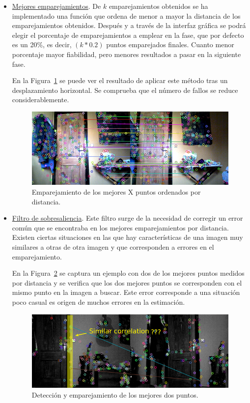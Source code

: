 \begin{itemize}
\item \underline{Mejores emparejamientos}. De $k$ emparejamientos obtenidos se ha implementado una función que ordena de menor a mayor la distancia de los emparejamientos obtenidos. Después y a través de la interfaz gráfica se podrá elegir el porcentaje de emparejamientos a emplear en la fase, que por defecto es un 20\%, es decir, $(k*0.2)$ puntos emparejados finales. Cuanto menor porcentaje mayor fiabilidad, pero menores resultados a pasar en la siguiente fase.

En la Figura~\ref{fig:bestPointsSift} se puede ver el resultado de aplicar este método tras un desplazamiento horizontal. Se comprueba que el número de fallos se reduce considerablemente.

\begin{figure}[th]
\centering
\includegraphics[scale=0.6]{Figures/best_points_sift.png}
\decoRule
\caption[bestPointsSift]{Emparejamiento de los mejores X puntos ordenados por distancia.}
\label{fig:bestPointsSift}
\end{figure}

\item \underline{Filtro de sobresaliencia}. Este filtro surge de la necesidad de corregir un error común que se encontraba en los mejores emparejamientos por distancia. Existen ciertas situaciones en las que hay características de una imagen muy similares a otras de otra imagen y que corresponden a errores en el emparejamiento.

En la Figura~\ref{fig:similarCorrelation} se captura un ejemplo con dos de los mejores puntos medidos por distancia y se verifica que los dos mejores puntos se corresponden con el mismo punto en la imagen a buscar. Este error corresponde a una situación poco casual es origen de muchos errores en la estimación.

\begin{figure}[th]
\centering
\includegraphics[scale=0.6]{Figures/similar-correlation.png}
\decoRule
\caption[similar-correlation]{Detección y emparejamiento de los mejores dos puntos.}
\label{fig:similarCorrelation}
\end{figure}


\end{itemize}
